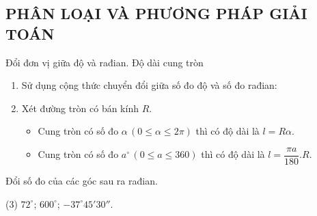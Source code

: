 \subsection{PHÂN LOẠI VÀ PHƯƠNG PHÁP GIẢI TOÁN}
\begin{dang}{Đổi đơn vị giữa độ và rađian. Độ dài cung tròn}
	\begin{enumerate}[\faCheckSquareO]
		\item Sử dụng cộng thức chuyển đổi giữa số đo độ và số đo rađian:
		\item Xét đường tròn có bán kính $R$.
		\begin{itemize}
			\item   Cung tròn có số đo $\alpha \,\left(0\le \alpha \le 2\pi \right)$ thì có độ dài là $l=R\alpha$.
			\item   Cung tròn có số đo $a^\circ \, \left(0\le a\le 360\right)$ thì có độ dài là $l=\dfrac{\pi a}{180}.R$.
		\end{itemize}
	\end{enumerate}
\end{dang}

\begin{vd}
	Đổi số đo của các góc sau ra rađian.
	\begin{tasks}(3)
		\task $72^\circ$;
		\task $600^\circ$;
		\task $-37^\circ45'30''$.
	\end{tasks}
\end{vd} 

